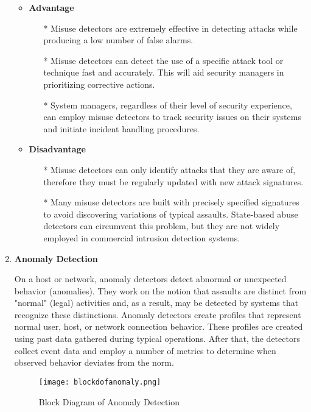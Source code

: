 \documentclass[12pt]{article}
\begin{document}
\begin{enumerate}
        \begin{itemize}
            \item \textbf{Advantage}
            \begin{itemize}
                \item[*] Misuse detectors are extremely effective in detecting attacks while producing a low number of false alarms.
                \item[*] Misuse detectors can detect the use of a specific attack tool or technique fast and accurately. This will aid security managers in prioritizing corrective actions. 
                \item[*] System managers, regardless of their level of security experience, can employ misuse detectors to track security issues on their systems and initiate incident handling procedures.
            \end{itemize}
        \item \textbf{Disadvantage}
        \begin{itemize}
            \item[*] Misuse detectors can only identify attacks that they are aware of, therefore they must be regularly updated with new attack signatures.
            \item[*] Many misuse detectors are built with precisely specified signatures to avoid discovering variations of typical assaults. State-based abuse detectors can circumvent this problem, but they are not widely employed in commercial intrusion detection systems. 
        \end{itemize}
        \end{itemize}
        \clearpage
        \item \textbf{Anomaly Detection}
        \par On a host or network, anomaly detectors detect abnormal or unexpected behavior (anomalies). They work on the notion that assaults are distinct from "normal" (legal) activities and, as a result, may be detected by systems that recognize these distinctions. Anomaly detectors create profiles that represent normal user, host, or network connection behavior. These profiles are created using past data gathered during typical operations. After that, the detectors collect event data and employ a number of metrics to determine when observed behavior deviates from the norm.
        
        \begin{figure}[h]
        \centering
        \texttt{[image: blockdofanomaly.png]}
        \caption{Block Diagram of Anomaly Detection}
    \end{figure}


\end{enumerate}
\end{document}

